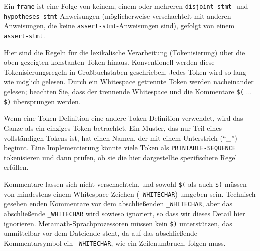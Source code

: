 Ein \texttt{frame} ist eine Folge von keinem, einem oder mehreren \texttt{disjoint-{\allowbreak}stmt}- und \texttt{hypothe\-ses-{\allowbreak}stmt}-Anweisungen (möglicherweise verschachtelt mit anderen Anweisungen, die keine \texttt{assert-stmt}-Anweisungen sind), gefolgt von einem \texttt{assert-stmt}.

Hier sind die Regeln für die lexikalische Verarbeitung (Tokenisierung) über die oben gezeigten konstanten Token hinaus. Konventionell werden diese Tokenisierungsregeln in Großbuchstaben geschrieben. Jedes Token wird so lang wie möglich gelesen. Durch ein Whitespace getrennte Token werden nacheinander gelesen; beachten Sie, dass der trennende Whitespace und die Kommentare \texttt{\$(} ... \texttt{\$)} übersprungen werden. 

Wenn eine Token-Definition eine andere Token-Definition verwendet, wird das Ganze als ein einziges Token betrachtet. Ein Muster, das nur Teil eines vollständigen Tokens ist, hat einen Namen, der mit einem Unterstrich ("`\_"') beginnt. Eine Implementierung könnte viele Token als \texttt{PRINTABLE-SEQUENCE} tokenisieren und dann prüfen, ob sie die hier dargestellte spezifischere Regel erfüllen. 

Kommentare lassen sich nicht verschachteln, und sowohl \texttt{\$(} als auch \texttt{\$)} müssen von mindestens einem Whitespace-Zeichen (\texttt{\_WHITECHAR}) umgeben sein. Technisch gesehen enden Kommentare vor dem abschließenden \texttt{\_WHITECHAR}, aber das abschließende \texttt{\_WHITECHAR} wird sowieso ignoriert, so dass wir dieses Detail hier ignorieren. Metamath-Sprachprozessoren müssen kein \texttt{\$)} unterstützen, das unmittelbar vor dem Dateiende steht, da auf das abschließende Kommentarsymbol ein \texttt{\_WHITECHAR}, wie ein Zeilenumbruch, folgen muss. 

